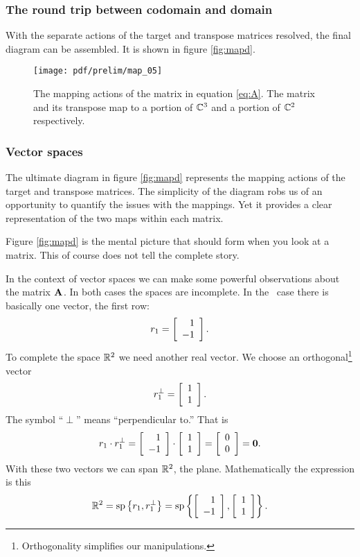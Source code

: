 \subsubsection{The round trip between codomain and domain}
With the separate actions of the target and transpose matrices resolved, the final diagram can be assembled. It is shown in figure \eqref{fig:mapd}.
\begin{figure}[htbp] %
   \centering
   \texttt{[image: pdf/prelim/map\_05]} 
   \caption{The mapping actions of the matrix in equation \eqref{eq:A}. The matrix and its transpose map to a portion of $\cmplx{3}$ and a portion of $\cmplx{2}$ respectively.}
   \label{fig:mapd}
\end{figure}

\subsubsection{Vector spaces}
The ultimate diagram in figure \eqref{fig:mapd} represents the mapping actions of the target and transpose matrices. The simplicity of the diagram robs us of an opportunity to quantify the issues with the mappings. Yet it provides a clear representation of the two maps within each matrix.

Figure \eqref{fig:mapd} is the mental picture that should form when you look at a matrix. This of course does not tell the complete story.

In the context of vector spaces we can make some powerful observations about the matrix $\A{}$. In both cases the spaces are incomplete. In the \vv \ case there is basically one vector, the first row:
\begin{equation}
  r_{1} = \mat{r}{1\\-1}.
\end{equation}
To complete the space $\real{2}$ we need another real vector. We choose an orthogonal\footnote{Orthogonality simplifies our manipulations.} vector
\begin{equation}
  r_{1}^{\perp} = \mat{r}{1\\1}.
\end{equation}
The symbol ``$\perp$'' means ``perpendicular to.'' That is
\begin{equation}
  r_{1}\cdot r_{1}^{\perp} = \mat{r}{1\\-1} \cdot \mat{c}{1\\1} = \mat{c}{0\\0} = \zero.
\end{equation}
With these two vectors we can span $\real{2}$, the plane. Mathematically the expression is this
\begin{equation}
  \real{2} = \spn \lst{r_{1},r_{1}^{\perp}} = \spn \lst{\mat{r}{1\\-1},\mat{c}{1\\1}}.
\end{equation}

